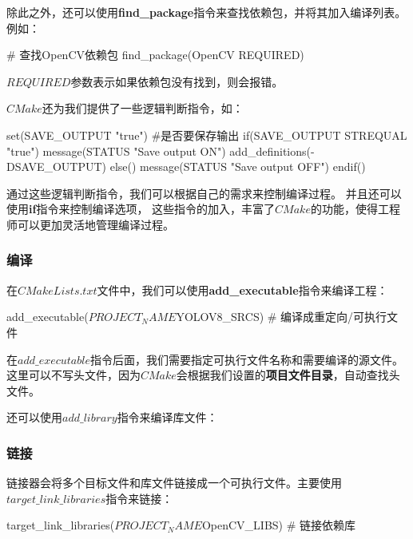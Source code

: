 除此之外，还可以使用\textbf{find\_package}指令来查找依赖包，并将其加入编译列表。例如：

\begin{tpython}
# 查找OpenCV依赖包
find_package(OpenCV REQUIRED)
\end{tpython}
$REQUIRED$参数表示如果依赖包没有找到，则会报错。

$CMake$还为我们提供了一些逻辑判断指令，如：
\begin{tpython}
set(SAVE_OUTPUT "true") #是否要保存输出
if(SAVE_OUTPUT STREQUAL "true")
    message(STATUS "Save output ON\n")
    add_definitions(-DSAVE_OUTPUT)
else()
    message(STATUS "Save output OFF\n")
endif()
\end{tpython}

通过这些逻辑判断指令，我们可以根据自己的需求来控制编译过程。
并且还可以使用\textbf{if}指令来控制编译选项，
这些指令的加入，丰富了$CMake$的功能，使得工程师可以更加灵活地管理编译过程。

\subsubsection{编译}

在$CMakeLists.txt$文件中，我们可以使用\textbf{add\_executable}指令来编译工程：

\begin{tpython}
add_executable(${PROJECT_NAME} ${YOLOV8_SRCS})  # 编译成重定向/可执行文件
\end{tpython}

在$add\_executable$指令后面，我们需要指定可执行文件名称和需要编译的源文件。
这里可以不写头文件，因为$CMake$会根据我们设置的\textbf{项目文件目录}，自动查找头文件。

还可以使用$add\_library$指令来编译库文件：


\subsubsection{链接}

链接器会将多个目标文件和库文件链接成一个可执行文件。主要使用$target\_link\_libraries$指令来链接：

\begin{tpython}
target_link_libraries(${PROJECT_NAME} ${OpenCV_LIBS})  # 链接依赖库
\end{tpython}

